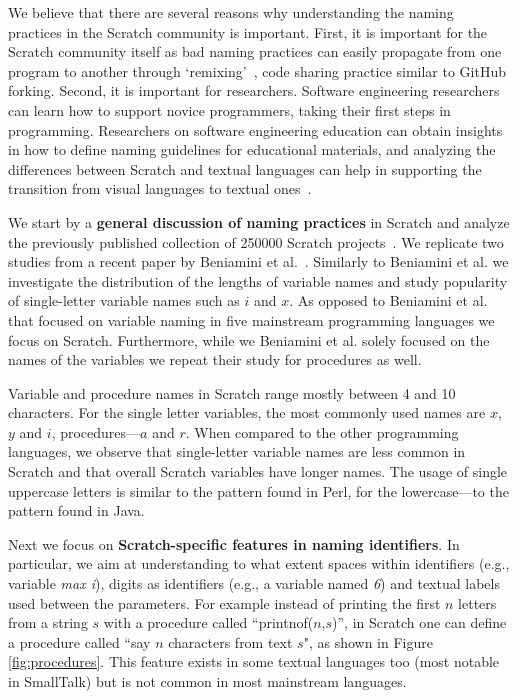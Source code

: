 \documentclass[conference]{IEEEtran}
\begin{document}
We believe that there are several reasons why understanding the naming practices in the Scratch community is important.
First, it is important for the Scratch community itself as bad naming practices can easily propagate from one program to another through `remixing'~\cite{Hill:Monroy-Hernandez,Davis:Kafai:Vasudevan:Lee}, code sharing practice similar to GitHub forking.
Second, it is important for researchers. Software engineering researchers can learn how to support novice programmers, taking their first steps in programming.
Researchers on software engineering education can obtain insights in how to define naming guidelines for educational materials, and analyzing the differences between Scratch and textual languages can help in supporting the transition from visual languages to textual ones~\cite{Dann,Matsuzawa}. 

We start by a \textbf{general discussion of naming practices} in Scratch and analyze the previously published collection of 250000 Scratch projects~\cite{Aivaloglou2016HowKC}. 
We replicate two studies from a recent paper by Beniamini et al.~\cite{Beniamini}.
Similarly to Beniamini et al. we investigate the distribution of the lengths of variable names and study popularity of single-letter variable names such as $i$ and $x$.
As opposed to Beniamini et al. that focused on variable naming in five mainstream programming languages we focus on Scratch.
Furthermore, while we Beniamini et al. solely focused on the names of the variables we repeat their study for procedures as well.

\begin{framed}
Variable and procedure names in Scratch range mostly between 4 and 10 characters. 
For the single letter variables, the most commonly used names are $x$, $y$ and $i$, procedures---$a$ and $r$. 
When compared to the other programming languages, we observe that single-letter variable names are less common in Scratch and that overall Scratch variables have longer names. 
The usage of single uppercase letters is similar to the pattern found in Perl, for the lowercase---to the pattern found in Java.
\end{framed}


Next we focus on \textbf{Scratch-specific features in naming identifiers}.
In particular, we aim at understanding to what extent spaces within identifiers (e.g., variable \emph{max i}), digits as identifiers (e.g., a variable named \emph{6}) and textual labels used between the parameters. 
For example instead of printing the first $n$ letters from a string $s$ with a procedure called ``printnof($n$,$s$)'', in Scratch one can define a procedure called ``say $n$ characters from text $s$", as shown in Figure \ref{fig:procedures}. 
This feature exists in some textual languages too (most notable in SmallTalk) but is not common in most mainstream languages. 
\end{document}
